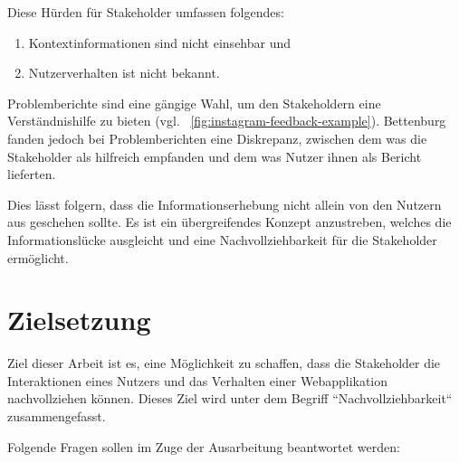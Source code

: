 
Diese Hürden für Stakeholder umfassen folgendes:
\begin{enumerate}
	\item Kontextinformationen sind nicht einsehbar und
	\item Nutzerverhalten ist nicht bekannt.
\end{enumerate}

Problemberichte sind eine gängige Wahl, um den Stakeholdern eine  Verständnishilfe zu bieten (vgl. ~\autoref{fig:instagram-feedback-example}). Bettenburg \etal \cite{WhatMakesAGoodBugReport} fanden jedoch bei Problemberichten eine Diskrepanz, zwischen dem was die Stakeholder als hilfreich empfanden und dem was Nutzer ihnen als Bericht lieferten.

Dies lässt folgern, dass die Informationserhebung nicht allein von den Nutzern aus geschehen sollte. Es ist ein übergreifendes Konzept anzustreben, welches die Informationslücke ausgleicht und eine Nachvollziehbarkeit für die Stakeholder ermöglicht.

\section{Zielsetzung}


Ziel dieser Arbeit ist es, eine Möglichkeit zu schaffen, dass die Stakeholder die Interaktionen eines Nutzers und das Verhalten einer Webapplikation nachvollziehen können. Dieses Ziel wird unter dem Begriff ``Nachvollziehbarkeit`` zusammengefasst.

Folgende Fragen sollen im Zuge der Ausarbeitung beantwortet werden:


